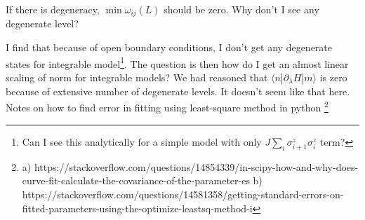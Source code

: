\documentclass[11pt,a4paper]{article}
\begin{document}
If there is degeneracy, $\min \omega_{ij}(L)$ should be zero. Why don't I see any degenerate level?

I find that because of open boundary conditions, I don't get any degenerate states for integrable model\footnote{Can I see this analytically for a simple model with only $J \sum_i\sigma_{i+1}^z \sigma_{i}^z$ term?}. The question is then how do I get an almost linear scaling of norm for integrable models? We had reasoned that $\langle n| \partial_{\lambda} H|m\rangle$ is zero because of extensive number of degenerate levels. It doesn't seem like that here.
Notes on how to find error in fitting using least-square method in python \footnote{a) https://stackoverflow.com/questions/14854339/in-scipy-how-and-why-does-curve-fit-calculate-the-covariance-of-the-parameter-es b) https://stackoverflow.com/questions/14581358/getting-standard-errors-on-fitted-parameters-using-the-optimize-leastsq-method-i }

 


%
\end{document}
